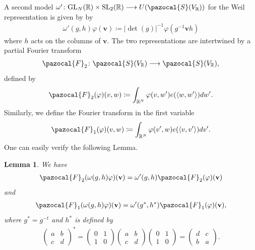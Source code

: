 \documentclass[a4paper,11pt]{amsart} %
\newcommand{\8}{\infty}
\newcommand{\vbf}{\mathbf{v}}
\newcommand{\four}{\pazocal{F}}
\newcommand{\SL}{\mathrm{SL}}
\newcommand{\GL}{\mathrm{GL}}
\newcommand{\R}{\mathbb{R}}
\newcommand{\Scal}{\pazocal{S}}
\theoremstyle{mytheoremstyle}
\newtheorem{lem}[thm]{Lemma}
\theoremstyle{remark}
\numberwithin{equation}{section}
\begin{document}
A second model $\omega' \colon \GL_N(\R) \times \SL_2(\R) \longrightarrow U(\Scal(V_\R))$ for the Weil representation is given by
by
\begin{align}
    \omega'(g,h)\varphi(\vbf)\coloneqq \vert \det(g)\vert^{-1}\varphi(g^{-1}\vbf h)
\end{align}
where $h$ acts on the columns of $\vbf$. The two representations are intertwined by a partial Fourier transform
\begin{align}
    \four_2 \colon \Scal(V_\R) \longrightarrow \Scal(V_\R),
\end{align}
defined by 
\begin{align}
   \four_2(\varphi)(v,w) \coloneqq \int_{\R^{N}} \varphi(v,w') e(\langle w,w' \rangle)dw'.
\end{align}
Similarly, we define the Fourier transform in the first variable
\begin{align}
    \four_1(\varphi)(v,w) \coloneqq \int_{\R^{N}} \varphi(v',w) e(\langle v,v' \rangle)dv'.
\end{align}
One can easily verify the following Lemma.
\begin{lem} \label{lem intertwiner}
    We have 
    \begin{align}
        \four_2(\omega(g,h)\varphi)(\vbf)=\omega'(g,h)\four_2(\varphi)(\vbf)
    \end{align}
and
\begin{align}
        \four_1(\omega(g,h)\varphi)(\vbf)=\omega'(g^\ast,h^\ast)\four_1(\varphi)(\vbf),
\end{align}
where $g^\ast=g^{-t}$ and $h^\ast$ is defined by 
\begin{align}
 \begin{pmatrix} a & b \\ c & d \end{pmatrix}^\ast=\begin{pmatrix} 0 & 1 \\ 1 & 0 \end{pmatrix} \begin{pmatrix} a & b \\ c & d \end{pmatrix}\begin{pmatrix} 0 & 1 \\ 1 & 0 \end{pmatrix}=\begin{pmatrix} d & c \\ b & a \end{pmatrix}.
 \end{align}
\end{lem}
\end{document}
